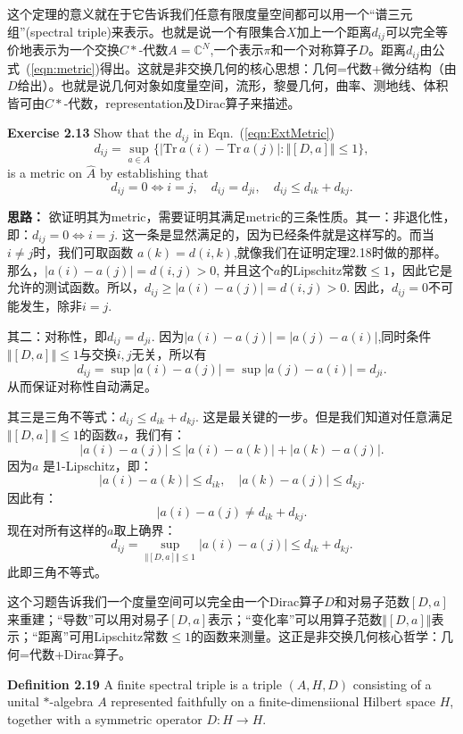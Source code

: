 这个定理的意义就在于它告诉我们任意有限度量空间都可以用一个“谱三元组”(spectral triple)来表示。也就是说一个有限集合$X$加上一个距离$d_{ij}$可以完全等价地表示为一个交换$C*$-代数$A=\mathbb{C}^N$,一个表示$\pi$和一个对称算子$D$。距离$d_{ij}$由公式~(\ref{eqn:metric})得出。这就是非交换几何的核心思想：几何=代数+微分结构（由$D$给出）。也就是说几何对象如度量空间，流形，黎曼几何，曲率、测地线、体积皆可由$C*$-代数，representation及Dirac算子来描述。

\textbf{Exercise 2.13} Show that the $d_{ij}$ in Eqn.~(\ref{eqn:ExtMetric})
\begin{equation}
    d_{ij}=\sup_{a\in A}\{|\text{Tr}\, a(i)-\text{Tr}\,a(j)|:\Vert [D,a]\Vert\leq 1\},
    \label{eqn:ExtMetric}
\end{equation}
 is a metric on $\hat{A}$ by establishing that 
 \[
 d_{ij}=0\Longleftrightarrow i=j,\quad d_{ij}=d_{ji},\quad d_{ij}\leq d_{ik}+d_{kj}.
 \]

 \textbf{思路：} 欲证明其为metric，需要证明其满足metric的三条性质。其一：非退化性，即：$d_{ij}=0\Leftrightarrow i=j$. 这一条是显然满足的，因为已经条件就是这样写的。而当$i\neq j$时，我们可取函数 $a(k)=d(i,k)$,就像我们在证明定理2.18时做的那样。那么，$|a(i)-a(j)|=d(i,j)>0$, 并且这个$a$的Lipschitz常数$\leq 1$，因此它是允许的测试函数。所以，$d_{ij}\geq |a(i)-a(j)|=d(i,j)>0$. 因此，$d_{ij}=0$不可能发生，除非$i=j$. 
 
 其二：对称性，即$d_{ij}=d_{ji}$. 因为$|a(i)-a(j)|=|a(j)-a(i)|$,同时条件$\Vert[D,a]\Vert\leq 1$与交换$i,j$无关，所以有
 \[d_{ij}=\sup|a(i)-a(j)|=\sup|a(j)-a(i)|=d_{ji}.\]
 从而保证对称性自动满足。

 其三是三角不等式：$d_{ij}\leq d_{ik}+d_{kj}$. 这是最关键的一步。但是我们知道对任意满足$\Vert[D,a]\Vert\leq1$的函数$a$，我们有：
 \[|a(i)-a(j)|\leq |a(i)-a(k)|+|a(k)-a(j)|.\]
 因为$a$ 是1-Lipschitz，即：
 \[|a(i)-a(k)|\leq d_{ik}, \quad |a(k)-a(j)|\leq d_{kj}.\]
 因此有：
 \[|a(i)-a(j)\neq d_{ik}+d_{kj}.\]
 现在对所有这样的$a$取上确界：
 \[d_{ij}=\sup_{\Vert[D,a]\Vert\leq1}|a(i)-a(j)|\leq d_{ik}+d_{kj}.\]
 此即三角不等式。

 这个习题告诉我们一个度量空间可以完全由一个Dirac算子$D$和对易子范数$[D,a]$来重建；“导数”可以用对易子$[D,a]$表示；“变化率”可以用算子范数$\Vert[D,a]\Vert$表示；“距离”可用Lipschitz常数$\leq1$的函数来测量。这正是非交换几何核心哲学：几何=代数+Dirac算子。

 \textbf{Definition 2.19} A finite spectral triple is a triple $(A, H, D)$ consisting of a unital $*$-algebra $A$ represented faithfully on a finite-dimensiional Hilbert space $H$, together with a symmetric operator $D:H\rightarrow H$.

